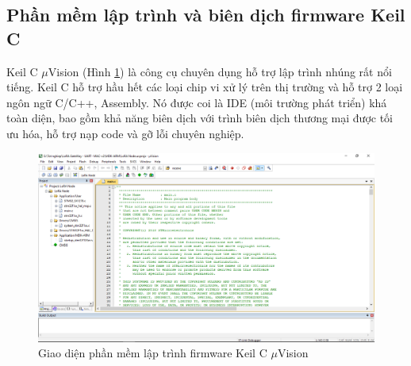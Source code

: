 \subsection{Phần mềm lập trình và biên dịch firmware Keil C}	
Keil C $\mu$Vision (Hình \ref{refhinh2_16}{}) là công cụ chuyên dụng hỗ trợ lập trình nhúng rất nổi tiếng. Keil C hỗ trợ hầu hết các loại chip vi xử lý trên thị trường và hỗ trợ 2 loại ngôn ngữ C/C++, Assembly. Nó được coi là IDE (môi trường phát triển) khá toàn diện, bao gồm khả năng biên dịch với trình biên dịch thương mại được tối ưu hóa, hỗ trợ nạp code và gỡ lỗi chuyên nghiệp.
\begin{figure}[h]
    \centering
     \includegraphics[scale=0.28]{image/hinh2_16}
    \caption{Giao diện phần mềm lập trình firmware Keil C $\mu$Vision}
    \label{refhinh2_16}
\end{figure}
